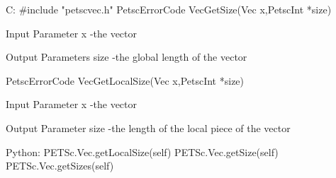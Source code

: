 C:
#include "petscvec.h"
PetscErrorCode  VecGetSize(Vec x,PetscInt *size)

Input Parameter
x -the vector

Output Parameters
size -the global length of the vector

PetscErrorCode  VecGetLocalSize(Vec x,PetscInt *size)

Input Parameter
x -the vector

Output Parameter
size -the length of the local piece of the vector 

Python:
PETSc.Vec.getLocalSize(self)
PETSc.Vec.getSize(self)
PETSc.Vec.getSizes(self)
